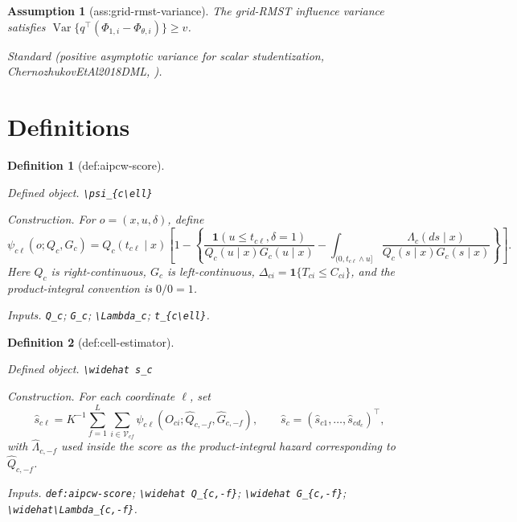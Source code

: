 \documentclass{article}
\newtheorem{assumption}{Assumption}
\newtheorem{definition}{Definition}
\begin{document}
\begin{assumption}[ass:grid-rmst-variance]\label{ass:grid-rmst-variance}
The grid-RMST influence variance satisfies \(\operatorname{Var}\{q^\top(\Phi_{1,i}-\Phi_{\theta,i})\}\ge v\).
\par\smallskip\noindent\emph{Standard} (positive asymptotic variance for scalar studentization, ChernozhukovEtAl2018DML, \cite{ChernozhukovEtAl2018DML}).
\end{assumption}

\section{Definitions}

\begin{definition}[def:aipcw-score]\label{def:aipcw-score}
\par\smallskip\noindent\emph{Defined object.} \texttt{\textbackslash{}\allowbreak{}psi\_\allowbreak{}\{c\textbackslash{}\allowbreak{}ell\}\allowbreak{}}
\par\smallskip\noindent\emph{Construction.} For \(o=(x,u,\delta)\), define \[\psi_{c\ell}(o;Q_c,G_c)=Q_c(t_{c\ell}\mid x)\left[1-\left\{\frac{\mathbf 1(u\le t_{c\ell},\delta=1)}{Q_c(u\mid x)G_c(u\mid x)}-\int_{(0,t_{c\ell}\wedge u]}\frac{\Lambda_c(ds\mid x)}{Q_c(s\mid x)G_c(s\mid x)}\right\}\right].\] Here \(Q_c\) is right-continuous, \(G_c\) is left-continuous, \(\Delta_{ci}=\mathbf 1\{T_{ci}\le C_{ci}\}\), and the product-integral convention is \(0/0=1\).
\par\smallskip\noindent\emph{Inputs.} \texttt{Q\_\allowbreak{}c}; \texttt{G\_\allowbreak{}c}; \texttt{\textbackslash{}\allowbreak{}Lambda\_\allowbreak{}c}; \texttt{t\_\allowbreak{}\{c\textbackslash{}\allowbreak{}ell\}\allowbreak{}}.
\end{definition}

\begin{definition}[def:cell-estimator]\label{def:cell-estimator}
\par\smallskip\noindent\emph{Defined object.} \texttt{\textbackslash{}\allowbreak{}widehat s\_\allowbreak{}c}
\par\smallskip\noindent\emph{Construction.} For each coordinate \(\ell\), set \[\widehat s_{c\ell}=K^{-1}\sum_{f=1}^L\sum_{i\in\mathcal V_{cf}}\psi_{c\ell}\!\left(O_{ci};\widehat Q_{c,-f},\widehat G_{c,-f}\right),\qquad \widehat s_c=(\widehat s_{c1},\ldots,\widehat s_{cd_c})^\top,\] with \(\widehat\Lambda_{c,-f}\) used inside the score as the product-integral hazard corresponding to \(\widehat Q_{c,-f}\).
\par\smallskip\noindent\emph{Inputs.} \texttt{def:\allowbreak{}aipcw-\allowbreak{}score}; \texttt{\textbackslash{}\allowbreak{}widehat Q\_\allowbreak{}\{c,\allowbreak{}-\allowbreak{}f\}\allowbreak{}}; \texttt{\textbackslash{}\allowbreak{}widehat G\_\allowbreak{}\{c,\allowbreak{}-\allowbreak{}f\}\allowbreak{}}; \texttt{\textbackslash{}\allowbreak{}widehat\textbackslash{}\allowbreak{}Lambda\_\allowbreak{}\{c,\allowbreak{}-\allowbreak{}f\}\allowbreak{}}.
\end{definition}
\end{document}
